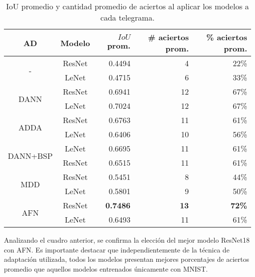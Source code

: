 \begin{table}[H]
    \centering
    \begin{tabular}{cc|rrr}
        \toprule
        AD                           & Modelo & $IoU$ prom.     & \# aciertos prom. & \% aciertos prom. \\
        \midrule
        \multirow[c]{2}{*}{-}        & ResNet & 0.4494          & 4                 & 22\%              \\
                                     & LeNet  & 0.4715          & 6                 & 33\%              \\\hline
        \multirow[c]{2}{*}{DANN}     & ResNet & 0.6941          & 12                & 67\%              \\
                                     & LeNet  & 0.7024          & 12                & 67\%              \\\hline
        \multirow[c]{2}{*}{ADDA}     & ResNet & 0.6763          & 11                & 61\%              \\
                                     & LeNet  & 0.6406          & 10                & 56\%              \\\hline
        \multirow[c]{2}{*}{DANN+BSP} & LeNet  & 0.6695          & 11                & 61\%              \\
                                     & ResNet & 0.6515          & 11                & 61\%              \\\hline
        \multirow[c]{2}{*}{MDD}      & ResNet & 0.5451          & 8                 & 44\%              \\
                                     & LeNet  & 0.5801          & 9                 & 50\%              \\\hline
        \multirow[c]{2}{*}{AFN}      & ResNet & \textbf{0.7486} & \textbf{13}       & \textbf{72\%}     \\
                                     & LeNet  & 0.6493          & 11                & 61\%              \\
        \bottomrule
    \end{tabular}
    \caption[IoU y aciertos por modelo]{IoU promedio y cantidad promedio de aciertos al aplicar los modelos a cada telegrama.}
    \label{tab:iou-cant-aciertos-en-telegramas}
\end{table}

Analizando el cuadro anterior, se confirma la elección del mejor modelo ResNet18 con AFN. Es importante destacar que
independientemente de la técnica de adaptación utilizada, todos los modelos presentan mejores porcentajes de aciertos
promedio que aquellos modelos entrenados únicamente con MNIST.

